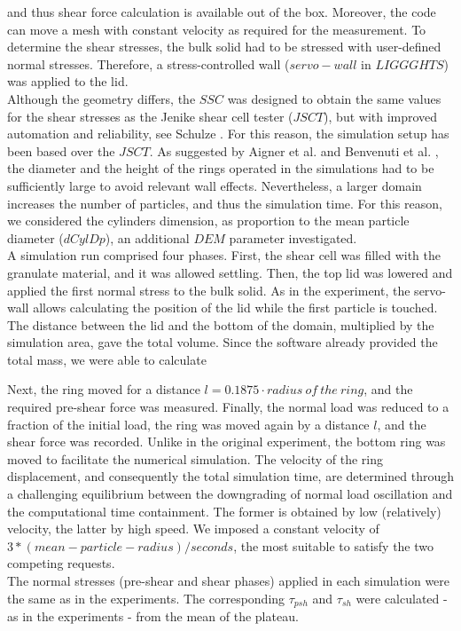 \begin{appendix}
and thus shear force calculation is available out of the box. Moreover, the code can move a mesh with constant 
velocity as required for the measurement. To determine the shear stresses, the bulk solid had to be stressed with 
user-defined normal stresses. Therefore, a stress-controlled wall ($servo-wall$ in $LIGGGHTS$) was applied to the lid. \\
Although the geometry differs, the $SSC$ was designed to obtain the same values for the shear stresses as the 
Jenike shear cell tester ($JSCT$), but with improved automation and reliability,
see Schulze \cite{RefWorks:118}. 
For this reason, the simulation setup has been
based over the $JSCT$.
As suggested by Aigner et al. \cite{RefWorks:139} and Benvenuti et al. \cite{RefWorks:173}, 
the diameter and the height of the rings operated in the simulations had to be sufficiently large to avoid relevant wall effects. 
Nevertheless, a larger domain increases the number of particles, and thus the simulation time. 
For this reason, we considered the cylinders dimension, as proportion to the mean particle diameter ($dCylDp$), 
an additional $DEM$ parameter investigated. \\   
A simulation run comprised four phases. 
First, the shear cell was filled with the granulate material, and it was allowed
settling.
Then, the top lid was lowered and applied the first normal stress to the bulk solid. 
As in the experiment, the servo-wall allows calculating the position of the lid
while the first particle is touched. 
The distance between the lid and the bottom of the domain, multiplied by the 
simulation area, gave the total volume.
Since the software already provided the total mass, we were able to calculate

Next, the ring moved for a distance $l=0.1875 \cdot radius ~of ~the ~ring$, and the required pre-shear force was measured. 
Finally, the normal load was reduced to a fraction of the initial load, 
the ring was moved again by a distance $l$, and the shear force was recorded. 
Unlike in the original experiment, the bottom ring was moved to facilitate the numerical simulation. 
The velocity of the ring displacement, and consequently the total simulation time, are determined 
through a challenging equilibrium between the downgrading of normal load oscillation and the computational time containment. 
The former is obtained by low (relatively) velocity, the latter by high speed. We imposed a constant velocity 
of $3*(mean-particle-radius)/seconds$, the most suitable to satisfy the two competing requests. \\
The normal stresses (pre-shear and shear phases) applied in each simulation were the same as in the experiments. 
The corresponding $\tau_{psh}$ and $\tau_{sh}$ were calculated - as in the experiments - from the mean of the plateau.\\


\end{appendix}
